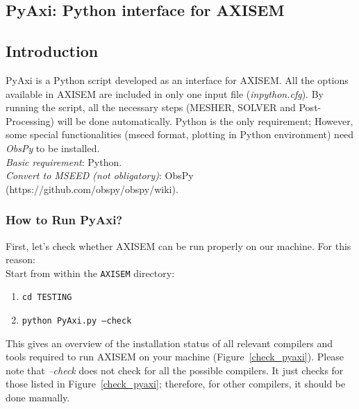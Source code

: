\subsection{PyAxi: Python interface for AXISEM}

\subsection{Introduction}
PyAxi is a Python script developed as an interface for AXISEM. 
All the options available in AXISEM are included in only one input file (\textit{inpython.cfg}).
By running the script, all the necessary steps (MESHER, SOLVER and Post-Processing) will be done automatically.
Python is the only requirement; However, some special functionalities (mseed format, plotting in Python environment) need \textit{ObsPy} to be installed. \\

\noindent \textit{Basic requirement}: Python.\\
\textit{Convert to MSEED (not obligatory)}: ObsPy (https://github.com/obspy/obspy/wiki).\\

\subsubsection{How to Run PyAxi?}
First, let's check whether AXISEM can be run properly on our machine. 
For this reason:\\

Start from within the {\tt AXISEM} directory:
\begin{enumerate}
\itemsep0em
\item {\tt cd TESTING}
\item {\tt python PyAxi.py --check}
\end{enumerate}
\noindent This gives an overview of the installation status of all relevant compilers and tools required
to run AXISEM on your machine (Figure~\ref{check_pyaxi}). 
Please note that \textit{--check} does not check for all the possible compilers.
It just checks for those listed in Figure~\ref{check_pyaxi}; 
therefore, for other compilers, it should be done manually.\\

